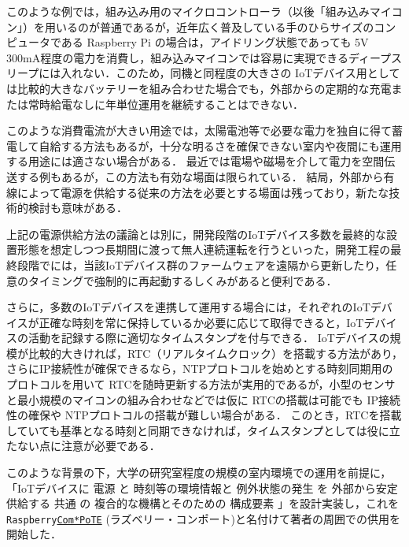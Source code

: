 このような例では，組み込み用のマイクロコントローラ（以後「組み込みマイコン」）を用いるのが普通であるが，近年広く普及している手のひらサイズのコンピュータである Raspberry Pi\cite{data:RaspberryPi} の場合は，アイドリング状態であっても 5V 300mA程度の電力を消費し，組み込みマイコンでは容易に実現できるディープスリープには入れない．このため，同機と同程度の大きさの IoTデバイス用としては比較的大きなバッテリーを組み合わせた場合でも，外部からの定期的な充電または常時給電なしに年単位運用を継続することはできない．

このような消費電流が大きい用途では，太陽電池等で必要な電力を独自に得て蓄電して自給する方法もあるが，十分な明るさを確保できない室内や夜間にも運用する用途には適さない場合がある．
最近では電場や磁場を介して電力を空間伝送する例もあるが，この方法も有効な場面は限られている．
結局，外部から有線によって電源を供給する従来の方法を必要とする場面は残っており，新たな技術的検討も意味がある．

上記の電源供給方法の議論とは別に，開発段階のIoTデバイス多数を最終的な設置形態を想定しつつ長期間に渡って無人連続運転を行うといった，開発工程の最終段階でには，当該IoTデバイス群のファームウェアを遠隔から更新したり，任意のタイミングで強制的に再起動するしくみがあると便利である．

さらに，多数のIoTデバイスを連携して運用する場合には，それぞれのIoTデバイスが正確な時刻を常に保持しているか必要に応じて取得できると，IoTデバイスの活動を記録する際に適切なタイムスタンプを付与できる．
IoTデバイスの規模が比較的大きければ，RTC（リアルタイムクロック）を搭載する方法があり，さらにIP接続性が確保できるなら，NTPプロトコルを始めとする時刻同期用のプロトコルを用いて
RTCを随時更新する方法が実用的であるが，小型のセンサと最小規模のマイコンの組み合わせなどでは仮に RTCの搭載は可能でも IP接続性の確保や NTPプロトコルの搭載が難しい場合がある．
このとき，RTCを搭載していても基準となる時刻と同期できなければ，タイムスタンプとしては役に立たない点に注意が必要である．

このような背景の下，大学の研究室程度の規模の室内環境での運用を前提に，
「IoTデバイスに
電源 と
時刻等の環境情報と
例外状態の発生 を
外部から安定供給する
共通 の
複合的な機構とそのための
構成要素
」を設計実装し，これを
{\tt Raspberry\underline{Com*PoTE}}
(ラズベリー・コンポート)と名付けて著者の周囲での供用を開始した．

